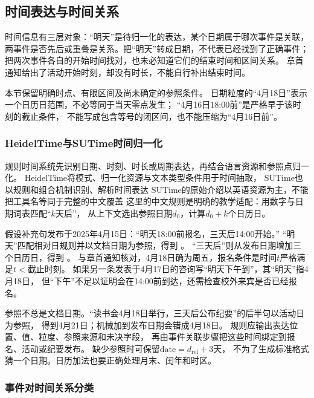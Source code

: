 \subsection{时间表达与时间关系}
\label{sec:nlp-extraction-temporal}

时间信息有三层对象：“明天”是待归一化的表达，某个日期属于哪次事件是关联，
两事件是否先后或重叠是关系。把“明天”转成日期，不代表已经找到了正确事件；
把两次事件各自的开始时间找对，也未必知道它们的结束时间和区间关系。
章首通知给出了活动开始时刻，却没有时长，不能自行补出结束时间。

本节保留明确时点、有限区间及尚未确定的参照条件。
日期粒度的“4月18日”表示一个日历日范围，不必等同于当天零点发生；
“4月16日18:00前”是严格早于该时刻的截止条件，
不能写成包含等号的闭区间，也不能压缩为“4月16日前”。

\subsubsection{HeidelTime与SUTime时间归一化}
\label{sec:nlp-extraction-time-normalization}

规则时间系统先识别日期、时刻、时长或周期表达，再结合语言资源和参照点归一化。
HeidelTime将模式、归一化资源与文本类型条件用于时间抽取，
SUTime也以规则和组合机制识别、解析时间表达
SUTime的原始介绍以英语资源为主，不能把工具名等同于完整的中文覆盖
这里的中文规则是明确的教学适配：用数字与日期词表匹配“$k$天后”，
从上下文选出参照日期$d_0$，计算$d_0+k$个日历日。

假设补充句发布于2025年4月15日：“明天18:00前报名，三天后14:00开始。”
“明天”匹配相对日规则并以文档日期为参照，得到
。
“三天后”则从发布日期增加三个日历日，得到
。
与章首通知核对，4月18日确为周五，报名条件是时间$t$严格满足$t<$截止时刻。
如果另一条发表于4月17日的咨询写“明天下午到”，其“明天”指4月18日，
但“下午”不足以证明会在14:00前到达，还需检查校外来宾是否已经报名。

参照不总是文档日期。“读书会4月18日举行，三天后公布纪要”的后半句以活动日为参照，
得到4月21日；机械加到发布日期会错成4月18日。
规则应输出表达位置、值、粒度、参照来源和未决字段，
再由事件关联步骤把这些时间绑定到报名、活动或纪要发布。
缺少参照时可保留$\text{date}=d_{\mathrm{ref}}+3\text{天}$，
不为了生成标准格式猜一个日期。日历加法也要正确处理月末、闰年和时区。

\subsubsection{事件对时间关系分类}
\label{sec:nlp-extraction-temporal-classifier}

